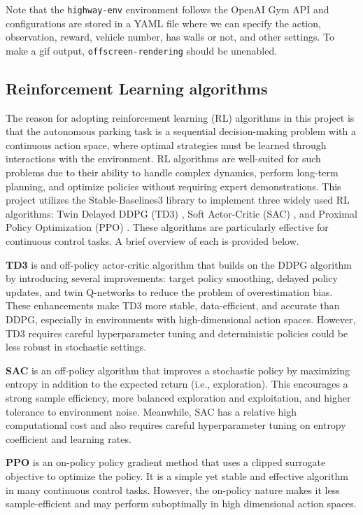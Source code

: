 \documentclass{article}
\begin{document}
Note that the \texttt{highway-env} environment follows the OpenAI Gym API and configurations are stored in a YAML file where we can specify the action, observation, reward, vehicle number, has walls or not, and other settings. To make a gif output, \texttt{offscreen-rendering} should be unenabled.

\subsection{Reinforcement Learning algorithms}

The reason for adopting reinforcement learning (RL) algorithms in this project is that the autonomous parking task is a sequential decision-making problem with a continuous action space, where optimal strategies must be learned through interactions with the environment. RL algorithms are well-suited for such problems due to their ability to handle complex dynamics, perform long-term planning, and optimize policies without requiring expert demonstrations. This project utilizes the Stable-Baselines3 \cite{stable-baselines3} library to implement three widely used RL algorithms: Twin Delayed DDPG (TD3) \cite{fujimoto2018addressing}, Soft Actor-Critic (SAC) \cite{haarnoja2018soft}, and Proximal Policy Optimization (PPO) \cite{schulman2017proximal}. These algorithms are particularly effective for continuous control tasks. A brief overview of each is provided below.

\textbf{TD3} is and off-policy actor-critic algorithm that builds on the DDPG algorithm by introducing several improvements: target policy smoothing, delayed policy updates, and twin Q-networks to reduce the problem of overestimation bias. These enhancements make TD3 more stable, data-efficient, and accurate than DDPG, especially in environments with high-dimensional action spaces. However, TD3 requires careful hyperparameter tuning and deterministic policies could be less robust in stochastic settings.

\textbf{SAC} is an off-policy algorithm that improves a stochastic policy by maximizing entropy in addition to the expected return (i.e., exploration). This encourages a strong sample efficiency, more balanced exploration and exploitation, and higher tolerance to environment noise. Meanwhile, SAC has a relative high computational cost and also requires careful hyperparameter tuning on entropy coefficient and learning rates.

\textbf{PPO} is an on-policy policy gradient method that uses a clipped surrogate objective to optimize the policy. It is a simple yet stable and effective algorithm in many continuous control tasks. However, the on-policy nature makes it less sample-efficient and may perform suboptimally in high dimensional action spaces.
\end{document}
